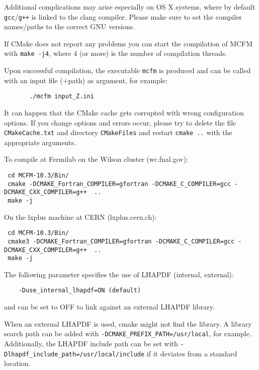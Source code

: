  Additional complications may arise especially on OS X systems, where by
 default \texttt{gcc}/\texttt{g++} is linked to the clang compiler. Please
 make sure to set the compiler names/paths to the correct GNU versions.
 
 If CMake does not report any problems you can start the compilation of
 MCFM with \texttt{make\ -j4}, where 4 (or more) is the number of
 compilation threads.
 
 Upon successful compilation, the executable \texttt{mcfm} is produced
 and can be called with an input file (+path) as argument, for example:
 \begin{verbatim}
       ./mcfm input_Z.ini
 \end{verbatim}
 
 It can happen that the CMake cache gets corrupted with wrong
 configuration options. If you change options and errors occur, please
 try to delete the file \texttt{CMakeCache.txt} and directory
 \texttt{CMakeFiles} and restart \texttt{cmake\ ..} with the appropriate
 arguments.
 
 
 To compile at Fermilab on the Wilson cluster (wc.fnal.gov):
 \begin{verbatim}
 cd MCFM-10.3/Bin/
 cmake -DCMAKE_Fortran_COMPILER=gfortran -DCMAKE_C_COMPILER=gcc -DCMAKE_CXX_COMPILER=g++  ..
 make -j
 \end{verbatim}

 
  On the lxplus machine at CERN (lxplus.cern.ch):
 \begin{verbatim}
 cd MCFM-10.3/Bin/
 cmake3 -DCMAKE_Fortran_COMPILER=gfortran -DCMAKE_C_COMPILER=gcc -DCMAKE_CXX_COMPILER=g++  ..
 make -j
 \end{verbatim}

  
 \hypertarget{lhapdf}{%
 	\label{lhapdf}}
 
 The following parameter specifies the use of LHAPDF (internal,
 external): 
 \begin{verbatim}
 	-Duse_internal_lhapdf=ON (default)
 \end{verbatim} 
 and can be set to OFF to link against an external LHAPDF library.
 
 When an external LHAPDF is used, cmake might not find the library. A
 library search path can be added with
 \texttt{-DCMAKE\_PREFIX\_PATH=/usr/local}, for example. Additionally,
 the LHAPDF include path can be set with
 \texttt{-Dlhapdf\_include\_path=/usr/local/include} if it deviates from
 a standard location.
 
